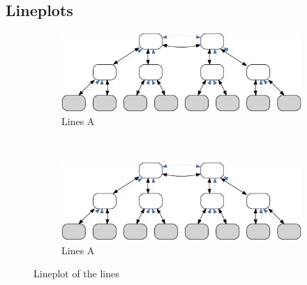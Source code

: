 \subsection{Lineplots}


\begin{figure}[H]
    \begin{subfigure}[b]{.5\textwidth}
      \centering
      \includegraphics[width=.95\textwidth,frame]{resources/images/example3}
      \caption{Lines A}
    \end{subfigure}~\begin{subfigure}[b]{.5\textwidth}
      \centering
      \includegraphics[width=.95\textwidth,frame]{resources/images/example3}
      \caption{Lines A}
    \end{subfigure}
    \caption{Lineplot of the lines}\label{fig:eval:perf:line:lines}
\end{figure}
